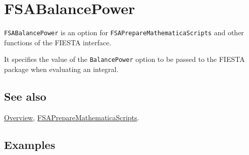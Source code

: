 \documentclass[../FeynHelpersManual.tex]{subfiles}
\begin{document}
\hypertarget{fsabalancepower}{
\section{FSABalancePower}\label{fsabalancepower}}

\texttt{FSABalancePower} is an option for
\texttt{FSAPrepareMathematicaScripts} and other functions of the FIESTA
interface.

It specifies the value of the \texttt{BalancePower} option to be passed
to the FIESTA package when evaluating an integral.

\subsection{See also}

\hyperlink{toc}{Overview},
\hyperlink{fsapreparemathematicascripts}{FSAPrepareMathematicaScripts}.

\subsection{Examples}
\end{document}
